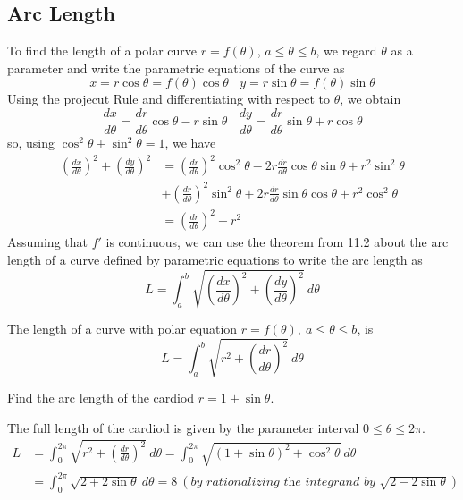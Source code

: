   \subsection*{Arc Length}
    To find the length of a polar curve $r=f(\theta)$, $a\leq\theta\leq b$, we regard $\theta$ as a parameter and write the parametric equations of the curve as
    $$x=r\cos\theta=f(\theta)\cos\theta \ \ \ \ y=r\sin\theta=f(\theta)\sin\theta$$
    Using the projecut Rule and differentiating with respect to $\theta$, we obtain
    $$\frac{dx}{d\theta}=\frac{dr}{d\theta}\cos\theta-r\sin\theta \ \ \ \ \frac{dy}{d\theta}=\frac{dr}{d\theta}\sin\theta+r\cos\theta$$
    so, using $\cos^2 \theta + \sin^2 \theta = 1$, we have
    \begin{align*}
      \left(\frac{dx}{d\theta}\right)^2 + \left(\frac{dy}{d\theta}\right)^2 &= \left(\frac{dr}{d\theta}\right)^2 \cos^2 \theta - 2r\frac{dr}{d\theta}\cos\theta\sin\theta+r^2 \sin^2 \theta \\
      &+ \left(\frac{dr}{d\theta}\right)^2 \sin^2 \theta + 2r\frac{dr}{d\theta}\sin\theta\cos\theta+r^2 \cos^2 \theta \\
      &= \left(\frac{dr}{d\theta}\right)^2 + r^2
    \end{align*}
    Assuming that $f'$ is continuous, we can use the theorem from 11.2 about the arc length of a curve defined by parametric equations to write the arc length as
    $$L=\int_{a}^{b}\sqrt{\left(\frac{dx}{d\theta}\right)^2 + \left(\frac{dy}{d\theta}\right)^2}\ d\theta$$
    \begin{definition}
      The length of a curve with polar equation $r=f(\theta),\ a\leq\theta\leq b$, is
      $$L=\int_{a}^{b}\sqrt{r^2 + \left(\frac{dr}{d\theta}\right)^2}\ d\theta$$
    \end{definition}
    \begin{example}
      Find the arc length of the cardiod $r=1+\sin\theta$.
    \end{example}
    \begin{solution}
      The full length of the cardiod is given by the parameter interval $0\leq\theta\leq2\pi$.
      \begin{align*}
        L &= \int_{0}^{2\pi}\sqrt{r^2 + \left(\frac{dr}{d\theta}\right)^2}\ d\theta = \int_{0}^{2\pi}\sqrt{(1+\sin\theta)^2 + \cos^2 \theta}\ d\theta \\
          &= \int_{0}^{2\pi}\sqrt{2+2\sin\theta}\ d\theta = 8\ (\textit{by rationalizing the integrand by $\sqrt{2-2\sin\theta}$})
      \end{align*}
    \end{solution}